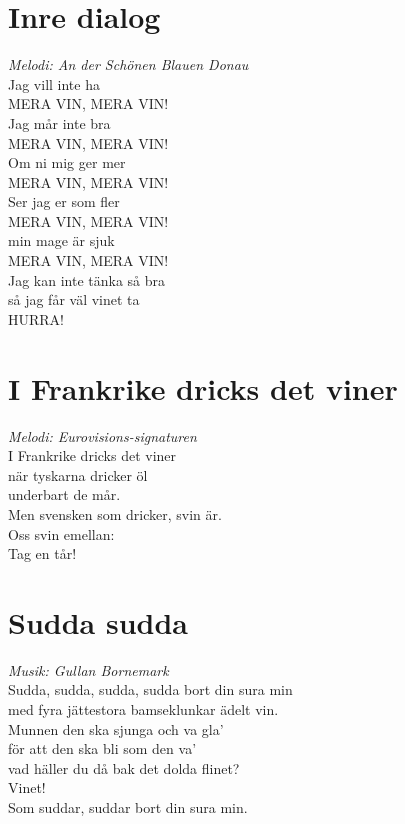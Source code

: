 \section{Inre dialog}
\textit{Melodi: An der Schönen Blauen Donau }
\vspace{2mm}\\
Jag vill inte ha\\
MERA VIN, MERA VIN!\\
Jag mår inte bra\\
MERA VIN, MERA VIN!\\
Om ni mig ger mer\\
MERA VIN, MERA VIN!\\
Ser jag er som fler\\
MERA VIN, MERA VIN!\\
min mage är sjuk\\
MERA VIN, MERA VIN!\\
Jag kan inte tänka så bra\\
så jag får väl vinet ta\\
HURRA!\\

\section{I Frankrike dricks det viner}
\textit{Melodi: Eurovisions-signaturen}
\vspace{2mm}\\
I Frankrike dricks det viner\\
när tyskarna dricker öl\\
underbart de mår.\\
Men svensken som dricker, svin är.\\
Oss svin emellan:\\
Tag en tår!\\

\section{Sudda sudda}
\textit{Musik: Gullan Bornemark}
\vspace{2mm}\\
Sudda, sudda, sudda, sudda bort din sura min\\
med fyra jättestora bamseklunkar ädelt vin.\\
Munnen den ska sjunga och va gla'\\
för att den ska bli som den va'\\
vad häller du då bak det dolda flinet?\\
Vinet!\\
Som suddar, suddar bort din sura min.\\

